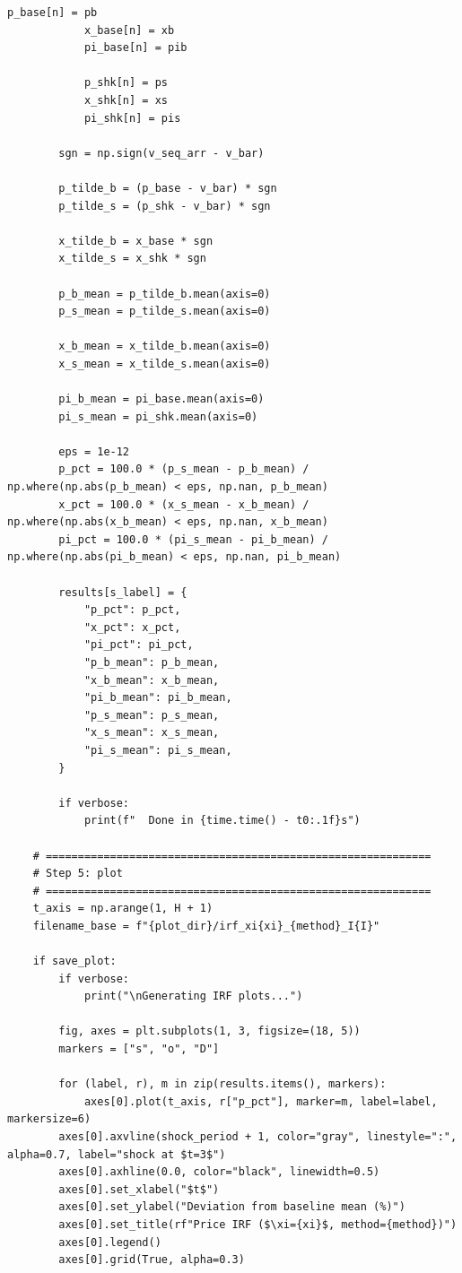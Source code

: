 \begin{lstlisting}[style=pythonstyle]
            p_base[n] = pb
            x_base[n] = xb
            pi_base[n] = pib

            p_shk[n] = ps
            x_shk[n] = xs
            pi_shk[n] = pis

        sgn = np.sign(v_seq_arr - v_bar)

        p_tilde_b = (p_base - v_bar) * sgn
        p_tilde_s = (p_shk - v_bar) * sgn

        x_tilde_b = x_base * sgn
        x_tilde_s = x_shk * sgn

        p_b_mean = p_tilde_b.mean(axis=0)
        p_s_mean = p_tilde_s.mean(axis=0)

        x_b_mean = x_tilde_b.mean(axis=0)
        x_s_mean = x_tilde_s.mean(axis=0)

        pi_b_mean = pi_base.mean(axis=0)
        pi_s_mean = pi_shk.mean(axis=0)

        eps = 1e-12
        p_pct = 100.0 * (p_s_mean - p_b_mean) / np.where(np.abs(p_b_mean) < eps, np.nan, p_b_mean)
        x_pct = 100.0 * (x_s_mean - x_b_mean) / np.where(np.abs(x_b_mean) < eps, np.nan, x_b_mean)
        pi_pct = 100.0 * (pi_s_mean - pi_b_mean) / np.where(np.abs(pi_b_mean) < eps, np.nan, pi_b_mean)

        results[s_label] = {
            "p_pct": p_pct,
            "x_pct": x_pct,
            "pi_pct": pi_pct,
            "p_b_mean": p_b_mean,
            "x_b_mean": x_b_mean,
            "pi_b_mean": pi_b_mean,
            "p_s_mean": p_s_mean,
            "x_s_mean": x_s_mean,
            "pi_s_mean": pi_s_mean,
        }

        if verbose:
            print(f"  Done in {time.time() - t0:.1f}s")

    # ============================================================
    # Step 5: plot
    # ============================================================
    t_axis = np.arange(1, H + 1)
    filename_base = f"{plot_dir}/irf_xi{xi}_{method}_I{I}"

    if save_plot:
        if verbose:
            print("\nGenerating IRF plots...")

        fig, axes = plt.subplots(1, 3, figsize=(18, 5))
        markers = ["s", "o", "D"]

        for (label, r), m in zip(results.items(), markers):
            axes[0].plot(t_axis, r["p_pct"], marker=m, label=label, markersize=6)
        axes[0].axvline(shock_period + 1, color="gray", linestyle=":", alpha=0.7, label="shock at $t=3$")
        axes[0].axhline(0.0, color="black", linewidth=0.5)
        axes[0].set_xlabel("$t$")
        axes[0].set_ylabel("Deviation from baseline mean (%)")
        axes[0].set_title(rf"Price IRF ($\xi={xi}$, method={method})")
        axes[0].legend()
        axes[0].grid(True, alpha=0.3)


\end{lstlisting}
